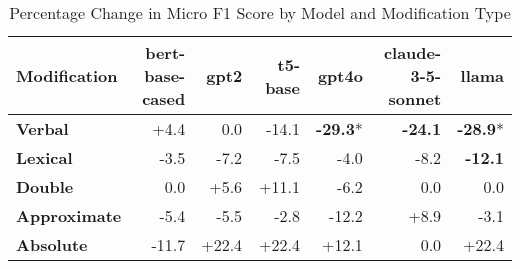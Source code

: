 \begin{table}[h]
\centering
\begin{tabular}{lrrrrrr}
\hline
Modification & \textbf{bert-base-cased} & \textbf{gpt2} & \textbf{t5-base} & \textbf{gpt4o} & \textbf{claude-3-5-sonnet} & \textbf{llama} \\
\hline
\textbf{Verbal} & \cellcolor{green!13} +4.4 & \cellcolor{red!0} 0.0 & \cellcolor{red!30} -14.1 & \cellcolor{red!30} \textbf{-29.3}* & \cellcolor{red!30} \textbf{-24.1} & \cellcolor{red!30} \textbf{-28.9}* \\
\hline
\textbf{Lexical} & \cellcolor{red!10} -3.5 & \cellcolor{red!21} -7.2 & \cellcolor{red!22} -7.5 & \cellcolor{red!12} -4.0 & \cellcolor{red!24} -8.2 & \cellcolor{red!30} \textbf{-12.1} \\
\hline
\textbf{Double} & \cellcolor{red!0} 0.0 & \cellcolor{green!16} +5.6 & \cellcolor{green!30} +11.1 & \cellcolor{red!18} -6.2 & \cellcolor{red!0} 0.0 & \cellcolor{red!0} 0.0 \\
\hline
\textbf{Approximate} & \cellcolor{red!16} -5.4 & \cellcolor{red!16} -5.5 & \cellcolor{red!8} -2.8 & \cellcolor{red!30} -12.2 & \cellcolor{green!26} +8.9 & \cellcolor{red!9} -3.1 \\
\textbf{Absolute} & \cellcolor{red!30} -11.7 & \cellcolor{green!30} +22.4 & \cellcolor{green!30} +22.4 & \cellcolor{green!30} +12.1 & \cellcolor{red!0} 0.0 & \cellcolor{green!30} +22.4 \\
\hline
\end{tabular}
\caption{Percentage Change in Micro F1 Score by Model and Modification Type}
\label{tab:ner_results}
\end{table}